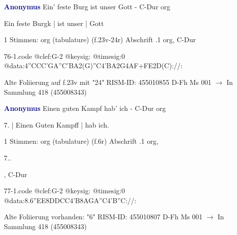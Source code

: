 \documentclass[twocolumn]{book}
\begin{document}
\newline \par \vspace{7pt} \textcolor{darkblue}{\textbf{Anonymus  }}
\newline Ein' feste Burg ist unser Gott - C-Dur
\newline org
\newline \begin{itshape}[f.24r, at left:] Ein feste Burgk | ist unser | Gott\end{itshape} 
\newline \textcolor{darkblue}{}  1 Stimmen: org (tabulature)  (f.23v-24r)
\newline Abschrift
.1  org, C-Dur  
\begin{filecontents*}{76-1.code}
@clef:G-2
@keysig:
@timesig:0
@data:4''CCC'GA''C'BA2(G)''C4'BA2G4AF+FE2D(C)://:
\end{filecontents*}
\newline
%
\newline Alte Foliierung auf f.23v mit "24"
\newline RISM-ID: 455010855
\newline D-Fh  Ms 001
\newline $\rightarrow$ In Sammlung 418 (455008343)
      
\newline \par \vspace{7pt} \textcolor{darkblue}{\textbf{Anonymus  }}
\newline Einen guten Kampf hab' ich - C-Dur
\newline org
\newline \begin{itshape}[f.6r, at left:] 7. | Einen Guten Kampff | hab ich.\end{itshape} 
\newline \textcolor{darkblue}{}  1 Stimmen: org (tabulature)  (f.6r)
\newline Abschrift
.1  org, \begin{itshape}7..\end{itshape}, C-Dur  
\begin{filecontents*}{77-1.code}
@clef:G-2
@keysig:
@timesig:0
@data:8.6''EE{8DD}{CC}4'B{8AGA''C}4'B''C://:
\end{filecontents*}
\newline
%
\newline Alte Foliierung vorhanden: "6"
\newline RISM-ID: 455010807
\newline D-Fh  Ms 001
\newline $\rightarrow$ In Sammlung 418 (455008343)
      
\end{document}
